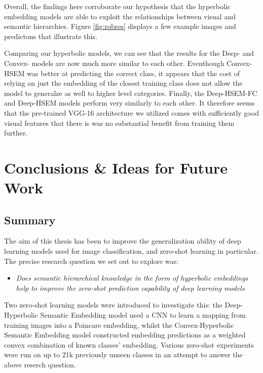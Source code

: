 \documentclass[12pt]{report}
\begin{document}
Overall, the findings here corroborate our hypothesis that the hyperbolic embedding models are able to exploit the relationships between visual and semantic hierarchies. Figure \ref{fig:robres} displays a few example images and predictons that illustrate this.

Comparing our hyperbolic models, we can see that the results for the Deep- and Convex- models are now much more similar to each other. Eventhough Convex-HSEM was better at predicting the correct class, it appears that the cost of relying on just the embedding of the closest training class does not allow the model to generalze as well to higher level categories. Finally, the Deep-HSEM-FC and Deep-HSEM models perform very similarly to each other. It therefore seems that the pre-trained VGG-16 architecture we utilized comes with sufficiently good visual features that there is was no substantial benefit from training them further.










\newpage
\chapter{Conclusions \& Ideas for Future Work}

\section{Summary}
The aim of this thesis has been to improve the generalization ability of deep learning models used for image classification, and zero-shot learning in particular. The precise research question we set out to explore was: 
\begin{itemize}
\item \textit{Does semantic hierarchical knowledge in the form of hyperbolic embeddings help to improve the zero-shot prediction capability of deep learning models}
\end{itemize}
Two zero-shot learning models were introduced to investigate this: the Deep-Hyperbolic Semantic Embedding model used a CNN to learn a mapping from training images into a Poincare embedding, whilst the Convex-Hyperbolic Semantic Embedding model constructed embedding predictions as a weighted convex combination of known classes' embedding. Various zero-shot experiments were run on up to 21k previously unseen classes in an attempt to answer the above reserch question.
\end{document}
